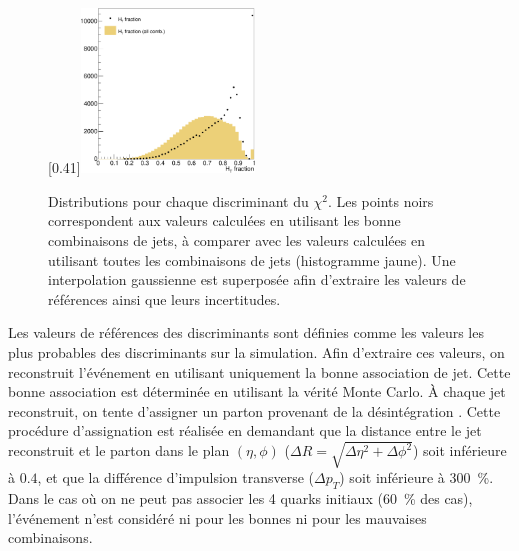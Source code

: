 \begin{figure}[p]
    [0.41\textwidth]{\includegraphics[width=0.41\textwidth]{chapitre6/figs/chi2/chi2_discrimant_combinations_ht_frac.pdf}}
    \caption{Distributions pour chaque discriminant du $\chi^2$. Les points noirs correspondent aux valeurs calculées en utilisant les bonne combinaisons de jets, à comparer avec les valeurs calculées en utilisant toutes les combinaisons de jets (histogramme jaune). Une interpolation gaussienne est superposée afin d'extraire les valeurs de références ainsi que leurs incertitudes.}
    \label{fig:chi2_distributions}
\end{figure}

Les valeurs de références des discriminants sont définies comme les valeurs les plus probables des discriminants sur la simulation. Afin d'extraire ces valeurs, on reconstruit l'événement \ttbar en utilisant uniquement la bonne association de jet. Cette bonne association est déterminée en utilisant la vérité Monte Carlo. À chaque jet reconstruit, on tente d'assigner un parton provenant de la désintégration \ttbar. Cette procédure d'assignation est réalisée en demandant que la distance entre le jet reconstruit et le parton dans le plan $(\eta, \phi)$ ($\Delta R = \sqrt{\Delta \eta^2 + \Delta \phi^2}$) soit inférieure à $0.4$, et que la différence d'impulsion transverse ($\Delta p_T$) soit inférieure à \SI{300}{\%}. Dans le cas où on ne peut pas associer les 4 quarks initiaux (\tilde \SI{60}{\%} des cas), l'événement n'est considéré ni pour les bonnes ni pour les mauvaises combinaisons.

